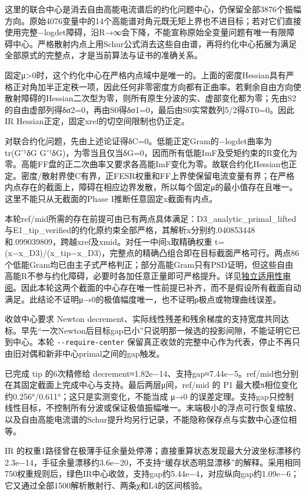 \documentclass[
  11pt,
  a4paper,
]{article}
\begin{document}
这里的联合中心是消去自由高能电流谱后的约化问题中心，仍保留全部3876个振幅方向。原始4076变量中的14个高能谱对角元既无矩上界也不进目标；若对它们直接使用完整−logdet障碍，沿R→∞会下降，不能宣称原始全变量问题有唯一有限障碍中心。严格散射内点上用Schur公式消去这些自由谱，再将约化中心拓展为满足全部原式的完整点，才是当前算法与证书的准确关系。

固定μ\textgreater0时，这个约化中心在严格内点域中是唯一的。上面的密度Hessian具有严格正对角加半正定秩一项，因此任何非零密度方向都有正曲率。若剩余自由方向使散射障碍的Hessian二次型为零，则所有原生分波的实、虚部变化都为零；先由S2的自由虚部列得δσ2=0，再由S0得δσ1=0，最后由S0实常数列5/2得δT0=0。因此IR
Hessian正定，固定xref的切空间限制也仍正定。

对联合约化问题，先由上述论证得δC=0。低能正定Gram的−logdet曲率为 tr(G⁻¹δG
G⁻¹δG)，为零当且仅当δG=0，因而所有低能ImF及受矩约束的R变化为零。高能FF盘的正二次曲率又要求各高能ImF变化为零。故联合约化Hessian也正定。密度/散射界使C有界，正FESR权重和FF上界使保留电流变量有界；在严格内点存在的截面上，障碍在相应边界发散，所以每个固定μ的最小值存在且唯一。这里不能只从无截面的Phase
I推断任意固定x截面有内点。

本轮ref/mid所需的存在前提可由已有两点具体满足：D3\_analytic\_primal\_lifted与E1\_tip\_verified的约化原约束全部严格，其解析x分别约.040853448和.099039809，跨越xref及xmid。对任一中间x取精确权重
t=(x−x\_D3)/(x\_tip−x\_D3)，完整点的精确凸组合即在目标截面严格可行。两点86个低能Gram均已由主子式严格判正；部分高能Gram只有PSD证明，但这些自由高能R不参与约化障碍，必要时各加任意正量即可严格提升。详见\href{PROOF_SCOPE_REVIEW_ZH.md}{独立适用性审阅}。因此本轮这两个截面的中心存在唯一性前提已补齐，而不是假设所有截面自动满足。此结论不证明μ→0的极值幅度唯一，也不证明ρ极点或物理曲线误差。

收敛中心要求 Newton
decrement、实际线性残差和残余梯度的支持宽度共同达标。早先``一次Newton后目标gap已小''只说明那一候选的投影间隙，不能证明它已到中心。本轮
\texttt{-\/-require-center}
保留真正收敛的完整中心作为代表，停止不再只由旧对偶和新非中心primal之间的gap触发。

已完成 tip 的6次精修给
decrement≈1.82e−14、支持gap≈7.44e−5。ref/mid也分别在其固定截面上完成中心与支持。最后两层μ间，ref/mid
的 P1 最大模π相位变化约0.256°/0.611°；这只是实测变化，不能当成 μ→0
的误差定理。支持gap只控制线性目标，不控制所有分波或保证极值振幅唯一。末端极小的浮点可行恢复缩放、以及自由高能电流谱的Schur提升均另行记录，不能隐称保存点与实数中心逐位相等。

IR
的权重1路径曾在极薄手征余量处停滞；直接重算状态发现最大分波坐标漂移约2.3e−14，手征余量漂移约3.6e−20，不支持``缓存状态明显漂移''的解释。采用相同750权重规则后，绿色IR中心收敛，支持gap约5.44e−4，对应纵向gap约1.09e−6；它又通过全部1500解析散射行、两条χ和L4的区间核验。
\end{document}
